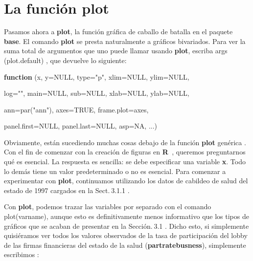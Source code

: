 \documentclass[
]{book}
\newenvironment{Shaded}{\begin{snugshade}}{\end{snugshade}}
\newcommand{\AttributeTok}[1]{\textcolor[rgb]{0.77,0.63,0.00}{#1}}
\newcommand{\ConstantTok}[1]{\textcolor[rgb]{0.00,0.00,0.00}{#1}}
\newcommand{\ControlFlowTok}[1]{\textcolor[rgb]{0.13,0.29,0.53}{\textbf{#1}}}
\newcommand{\FunctionTok}[1]{\textcolor[rgb]{0.00,0.00,0.00}{#1}}
\newcommand{\NormalTok}[1]{#1}
\newcommand{\StringTok}[1]{\textcolor[rgb]{0.31,0.60,0.02}{#1}}
\begin{document}
\hypertarget{la-funciuxf3n-plot}{%
\section*{\texorpdfstring{La función \textbf{plot}}{La función plot}}\label{la-funciuxf3n-plot}}

Pasamos ahora a \textbf{plot}, la función gráfica de caballo de batalla en el paquete \textbf{base}. El comando \textbf{plot} se presta naturalmente a gráficos bivariados. Para ver la suma total de argumentos que uno puede llamar usando \textbf{plot}, escriba args (plot.default) , que devuelve lo siguiente:

\begin{Shaded}
\begin{Highlighting}[]
\ControlFlowTok{function}\NormalTok{ (x, }\AttributeTok{y=}\ConstantTok{NULL}\NormalTok{, }\AttributeTok{type=}\StringTok{"p"}\NormalTok{, }\AttributeTok{xlim=}\ConstantTok{NULL}\NormalTok{, }\AttributeTok{ylim=}\ConstantTok{NULL}\NormalTok{,}

    \AttributeTok{log=}\StringTok{""}\NormalTok{, }\AttributeTok{main=}\ConstantTok{NULL}\NormalTok{, }\AttributeTok{sub=}\ConstantTok{NULL}\NormalTok{, }\AttributeTok{xlab=}\ConstantTok{NULL}\NormalTok{, }\AttributeTok{ylab=}\ConstantTok{NULL}\NormalTok{,}

    \AttributeTok{ann=}\FunctionTok{par}\NormalTok{(}\StringTok{"ann"}\NormalTok{), }\AttributeTok{axes=}\ConstantTok{TRUE}\NormalTok{, }\AttributeTok{frame.plot=}\NormalTok{axes,}

    \AttributeTok{panel.first=}\ConstantTok{NULL}\NormalTok{, }\AttributeTok{panel.last=}\ConstantTok{NULL}\NormalTok{, }\AttributeTok{asp=}\ConstantTok{NA}\NormalTok{, ...)}
\end{Highlighting}
\end{Shaded}

Obviamente, están sucediendo muchas cosas debajo de la función \textbf{plot} genérica . Con el fin de comenzar con la creación de figuras en \textbf{R}  , queremos preguntarnos qué es esencial. La respuesta es sencilla: se debe especificar una variable \textbf{x}. Todo lo demás tiene un valor predeterminado o no es esencial. Para comenzar a experimentar con \textbf{plot}, continuamos utilizando los datos de cabildeo de salud del estado de 1997 cargados en la Sect. 3.1.1 .

Con \textbf{plot}, podemos trazar las variables por separado con el comando plot(varname), aunque esto es definitivamente menos informativo que los tipos de gráficos que se acaban de presentar en la Sección. 3.1 . Dicho esto, si simplemente quisiéramos ver todos los valores observados de la tasa de participación del lobby de las firmas financieras del estado de la salud (\textbf{partratebusness}), simplemente escribimos :
\end{document}

